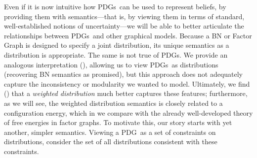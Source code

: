 \documentclass{article}
\newcommand{\MN}{PDG}
\newcommand{\MNs}{\MN s}
\numberwithin{equation}{section}
\begin{document}
	Even if it is now intuitive how \MNs\ can be used to represent beliefs, by providing them with semantics---that is, by viewing them in terms of standard, well-established notions of uncertainty---we will be able to better articulate the relationships between \MNs\ and other graphical models. 
	Because a BN or Factor Graph is designed to specify a joint distribution, its unique semantics as a distribution is appropriate. The same is not true of \MNs. 
	We provide an analogous interpretation (), allowing us to view \MNs\ as distributions (recovering BN semantics as promised), but this approach does not adequately capture the inconsistency or modularity we wanted to model. 
	Ultimately, we find () that a \emph{weighted distribution} \parencite[cf.][]{halpern2015weighted} much better captures these features; furthermore, as we will see, the weighted distribution semantics is closely related to a configuration energy, which in  we compare with the already well-developed theory of free energies in factor graphs. 
	To motivate this, our story starts with yet another, simpler semantics. Viewing a \MN\ as a set of constraints on distributions, consider the set of all distributions consistent with these constraints.
	
\end{document}

